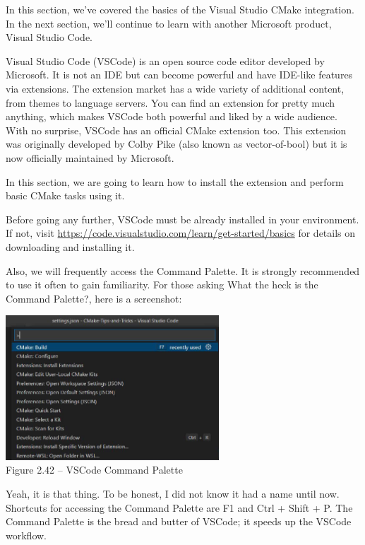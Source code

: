 In this section, we've covered the basics of the Visual Studio CMake integration. In the next section, we'll continue to learn with another Microsoft product, Visual Studio Code.


Visual Studio Code (VSCode) is an open source code editor developed by Microsoft. It is not an IDE but can become powerful and have IDE-like features via extensions. The extension market has a wide variety of additional content, from themes to language servers. You can find an extension for pretty much anything, which makes VSCode both powerful and liked by a wide audience. With no surprise, VSCode has an official CMake extension too. This extension was originally developed by Colby Pike (also known as vector-of-bool) but it is now officially maintained by Microsoft. 

In this section, we are going to learn how to install the extension and perform basic CMake tasks using it.

Before going any further, VSCode must be already installed in your environment. If not, visit \url{https://code.visualstudio.com/learn/get-started/basics} for details on downloading and installing it.

Also, we will frequently access the Command Palette. It is strongly recommended to use it often to gain familiarity. For those asking What the heck is the Command Palette?, here is a screenshot:

\begin{center}
\includegraphics[width=0.6\textwidth]{content/1/chapter2/images/42.jpg}\\
Figure 2.42 – VSCode Command Palette
\end{center}

Yeah, it is that thing. To be honest, I did not know it had a name until now. Shortcuts for accessing the Command Palette are F1 and Ctrl + Shift + P. The Command Palette is the bread and butter of VSCode; it speeds up the VSCode workflow.

